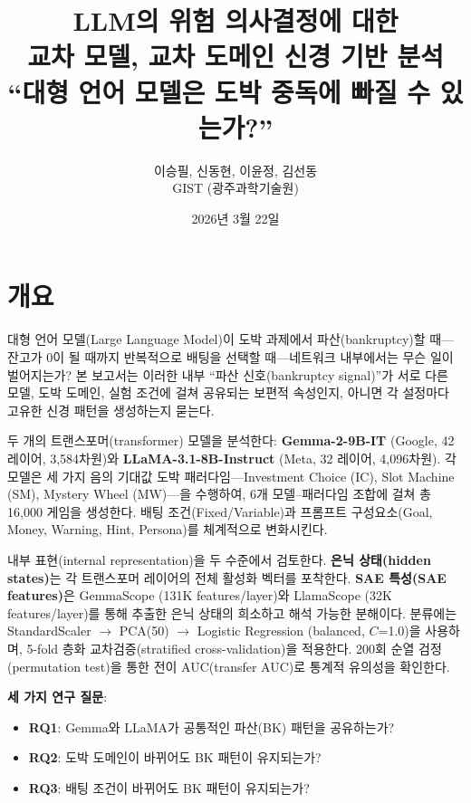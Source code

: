 \documentclass[11pt,a4paper]{article}
\title{\textbf{LLM의 위험 의사결정에 대한\\교차 모델, 교차 도메인 신경 기반 분석}\\[0.3em]
\normalsize ``대형 언어 모델은 도박 중독에 빠질 수 있는가?''}
\author{이승필, 신동현, 이윤정, 김선동\\
\small GIST (광주과학기술원)}
\date{2026년 3월 22일}
\begin{document}
\maketitle
\tableofcontents
\newpage

\section*{개요}

대형 언어 모델(Large Language Model)이 도박 과제에서 파산(bankruptcy)할 때---잔고가 0이 될 때까지 반복적으로 배팅을 선택할 때---네트워크 내부에서는 무슨 일이 벌어지는가? 본 보고서는 이러한 내부 ``파산 신호(bankruptcy signal)''가 서로 다른 모델, 도박 도메인, 실험 조건에 걸쳐 공유되는 보편적 속성인지, 아니면 각 설정마다 고유한 신경 패턴을 생성하는지 묻는다.

두 개의 트랜스포머(transformer) 모델을 분석한다: \textbf{Gemma-2-9B-IT} (Google, 42 레이어, 3{,}584차원)와 \textbf{LLaMA-3.1-8B-Instruct} (Meta, 32 레이어, 4{,}096차원). 각 모델은 세 가지 음의 기대값 도박 패러다임---Investment Choice (IC), Slot Machine (SM), Mystery Wheel (MW)---을 수행하여, 6개 모델--패러다임 조합에 걸쳐 총 16{,}000 게임을 생성한다. 배팅 조건(Fixed/Variable)과 프롬프트 구성요소(Goal, Money, Warning, Hint, Persona)를 체계적으로 변화시킨다.

내부 표현(internal representation)을 두 수준에서 검토한다. \textbf{은닉 상태(hidden states)}는 각 트랜스포머 레이어의 전체 활성화 벡터를 포착한다. \textbf{SAE 특성(SAE features)}은 GemmaScope (131K features/layer)와 LlamaScope (32K features/layer)를 통해 추출한 은닉 상태의 희소하고 해석 가능한 분해이다. 분류에는 StandardScaler $\rightarrow$ PCA(50) $\rightarrow$ Logistic Regression (balanced, $C$=1.0)을 사용하며, 5-fold 층화 교차검증(stratified cross-validation)을 적용한다. 200회 순열 검정(permutation test)을 통한 전이 AUC(transfer AUC)로 통계적 유의성을 확인한다.

\textbf{세 가지 연구 질문}:
\begin{itemize}[nosep]
    \item \textbf{RQ1}: Gemma와 LLaMA가 공통적인 파산(BK) 패턴을 공유하는가?
    \item \textbf{RQ2}: 도박 도메인이 바뀌어도 BK 패턴이 유지되는가?
    \item \textbf{RQ3}: 배팅 조건이 바뀌어도 BK 패턴이 유지되는가?
\end{itemize}
\end{document}
